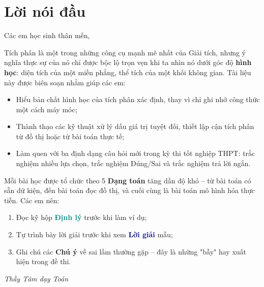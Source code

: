 \section*{Lời nói đầu}

Các em học sinh thân mến,

\medskip
Tích phân là một trong những công cụ mạnh mẽ nhất của Giải tích, nhưng ý nghĩa thực sự của nó chỉ được bộc lộ trọn vẹn khi ta nhìn nó dưới góc độ \textbf{hình học}: diện tích của một miền phẳng, thể tích của một khối không gian. Tài liệu này được biên soạn nhằm giúp các em:

\begin{itemize}[leftmargin=1.2cm]
  \item Hiểu bản chất hình học của tích phân xác định, thay vì chỉ ghi nhớ công thức một cách máy móc;
  \item Thành thạo các kỹ thuật xử lý dấu giá trị tuyệt đối, thiết lập cận tích phân từ đồ thị hoặc từ bài toán thực tế;
  \item Làm quen với ba định dạng câu hỏi mới trong kỳ thi tốt nghiệp THPT: trắc nghiệm nhiều lựa chọn, trắc nghiệm Đúng/Sai và trắc nghiệm trả lời ngắn.
\end{itemize}

\begin{hopchuy}
Mỗi bài học được tổ chức theo 5 \textbf{Dạng toán} tăng dần độ khó -- từ bài toán có sẵn dữ kiện, đến bài toán đọc đồ thị, và cuối cùng là bài toán mô hình hóa thực tiễn. Các em nên:
\begin{enumerate}[leftmargin=1.2cm]
  \item Đọc kỹ hộp \textcolor{teal}{\textbf{Định lý}} trước khi làm ví dụ;
  \item Tự trình bày lời giải trước khi xem \textcolor{navy}{\textbf{Lời giải}} mẫu;
  \item Ghi chú các \textcolor{amber}{\textbf{Chú ý}} về sai lầm thường gặp -- đây là những "bẫy" hay xuất hiện trong đề thi.
\end{enumerate}
\end{hopchuy}

\bigskip
\hfill \textit{Thầy Tâm dạy Toán}

\newpage
